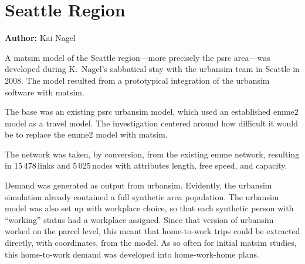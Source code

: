 \chapter{Seattle Region}
\label{ch:seattle}
\hfill \textbf{Author:} Kai Nagel


A \gls{matsim} model of the Seattle region---more precisely the \gls{psrc} area---was developed during K.\ Nagel's sabbatical stay with the \gls{urbansim} team in Seattle in 2008. The model resulted from a prototypical integration of the \gls{urbansim} software \citep[e.g.,][]{WaddellEtc2003UrbanSim} with \gls{matsim}. 

The base was an existing \gls{psrc} \gls{urbansim} model, which used an established \gls{emme2} model 
as a travel model. The investigation centered around how difficult it would be to replace the \gls{emme2} model with \gls{matsim}. 

The network was taken, by conversion, from the existing \gls{emme} network, resulting in 15\,478\,links and 5\,025\,nodes with attributes length, free speed, and capacity.

Demand was generated as output from \gls{urbansim}. Evidently, the \gls{urbansim} simulation already contained a full synthetic area population. The \gls{urbansim} model was also set up with workplace choice, so that each synthetic person with ``working'' status had a workplace assigned. Since that version of \gls{urbansim} worked on the parcel level, this meant that home-to-work trips could be extracted directly, with coordinates, from the model. As so often for initial \gls{matsim}  studies, this home-to-work demand was developed into home-work-home plans.

